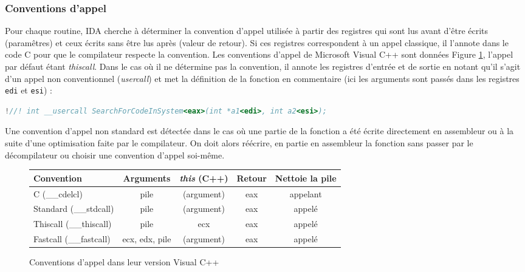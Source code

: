 \subsubsection{Conventions d'appel}

Pour chaque routine, IDA cherche à déterminer la convention d'appel utilisée à partir des registres qui sont lus avant d'être écrits (paramêtres) et ceux écrits sans être lus après (valeur de retour). Si ces registres correspondent à un appel classique, il l'annote dans le code C pour que le compilateur respecte la convention. Les conventions d'appel de Microsoft Visual C++ sont données Figure \ref{fig:callingconvention}, l'appel par défaut étant \emph{thiscall}. Dans le cas où il ne détermine pas la convention, il annote les registres d'entrée et de sortie en notant qu'il s'agit d'un appel non conventionnel (\emph{usercall}) et met la définition de la fonction en commentaire (ici les arguments sont passés dans les registres \texttt{edi} et \texttt{esi}) :
\begin{small}
\begin{lstlisting}[language={C}, escapechar=!]
!//! int __usercall SearchForCodeInSystem<eax>(int *a1<edi>, int a2<esi>);
\end{lstlisting}
\end{small}

Une convention d'appel non standard est détectée dans le cas où une partie de la fonction a été écrite directement en assembleur ou à la suite d'une optimisation faite par le compilateur. On doit alors réécrire, en partie en assembleur la fonction sans passer par le décompilateur ou choisir une convention d'appel soi-même.

\begin{figure}[h]
\begin{center}
\begin{tabular}{|l|c|c|c|c|}
\hline 
Convention & Arguments & \emph{this} (C++) & Retour & Nettoie la pile\\
\hline
C (\_\_cdelcl) & pile & (argument) & eax & appelant\\
Standard (\_\_stdcall) & pile & (argument) & eax & appelé\\
Thiscall (\_\_thiscall) & pile & ecx & eax & appelé\\
Fastcall (\_\_fastcall) & ecx, edx, pile & (argument) & eax & appelé\\
\hline
\end{tabular}
\end{center}
\caption{Conventions d'appel dans leur version Visual C++}
\label{fig:callingconvention}
\end{figure}



